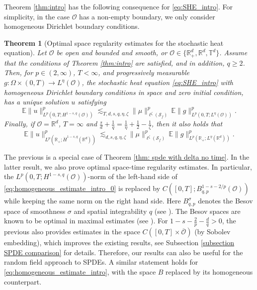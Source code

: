 \documentclass[reqno]{amsart}
\theoremstyle{plain}
\newtheorem{theorem}{Theorem}[section]
\theoremstyle{remark}
\theoremstyle{plain}
\numberwithin{equation}{section}
\newcommand\cO{\mathcal{O}}
\def\R{{\mathbb R}}
\newcommand{\E}{{\mathbb E}}
\newcommand{\Domm}{\mathcal{O}}
\newcommand{\T}{\mathbb{T}}
\newcommand{\1}{\one}
\newcommand{\Sf}{\mathcal{S}_{f}}
\begin{document}
\smallskip

Theorem \ref{thm:intro} has the following consequence for \eqref{eq:SHE_intro}.
For simplicity, in the case $\cO$ has a non-empty boundary, we only consider homogeneous Dirichlet boundary conditions. 

\begin{theorem}[Optimal space regularity estimates for the stochastic heat equation]
\label{thm: spde intro}
Let $\mathcal{O}$ be open and bounded and smooth, or $\mathcal{O} \in \{\R^d_+, \R^d,\T^d\}$. 
Assume that the conditions of Theorem \ref{thm:intro} are satisfied, and in addition, $q\geq 2$. Then,
for $p\in (2,\infty)$, $T<\infty$, and progressively measurable $g:\Omega\times(0,T)\to L^\eta(\Domm)$, the stochastic heat equation \eqref{eq:SHE_intro} with homogeneous Dirichlet boundary conditions in space and zero initial condition, has a unique solution $u$ satisfying
\begin{equation}
\label{eq:homogeneous_estimate_intro_0}
\E\|u\|_{L^p(0,T;H^{1-s,q}(\Domm))}^p
\lesssim_{T,d,s,q,\eta,\zeta} \|\mu\|_{\ell^{\zeta}(\Sf)}^p\,\E\|g\|^p_{L^p(0,T;L^{\eta}(\mathcal{O}))}.
\end{equation}
Finally, if $\Domm=\R^d$, $T=\infty$ and $
\frac{s}{d} + \frac{1}{q}  = \frac{1}{\eta} + \frac{1}{2} - \frac{1}{\zeta} $, then it also holds that 
\begin{equation}
\label{eq:homogeneous_estimate_intro}
\E\|u\|_{L^p(\R_+;\dot{H}^{1-s,q}(\R^d))}^p
\lesssim_{d,s,q,\eta,\zeta} \|\mu\|_{\ell^{\zeta}(\Sf)}^p \,\E\|g\|^p_{L^p(\R_+;L^{\eta}(\R^d))}.
\end{equation}
\end{theorem}

The previous is a special case of Theorem \ref{thm: spde with delta no time}. In the latter result, we also prove optimal space-time regularity estimates. In particular, the $L^p(0,T;H^{1-s,q}(\cO))$-norm of the left-hand side of \eqref{eq:homogeneous_estimate_intro_0} is replaced by $C([0,T];B^{1-s-2/p}_{q,p}(\cO))$ while keeping the same norm on the right hand side. Here $B^{\sigma}_{q,p}$ denotes the Besov space of smoothness $\sigma$ and spatial integrability $q$ (see \cite{Tri95}). The Besov spaces are known to be optimal in maximal estimates (see \cite{ALV21}). For $1-s-\frac2p - \frac{d}{q}>0$, the previous also provides estimates in the space $C([0,T]\times \overline{\cO})$ (by Sobolev embedding), which improves the existing results, see Subsection \ref{subsection SPDE comparison} for details. Therefore, our results can also be useful for the random field approach to SPDEs. 
A similar statement holds for \eqref{eq:homogeneous_estimate_intro}, with the space $B$ replaced by its homogeneous counterpart. 
\end{document}
